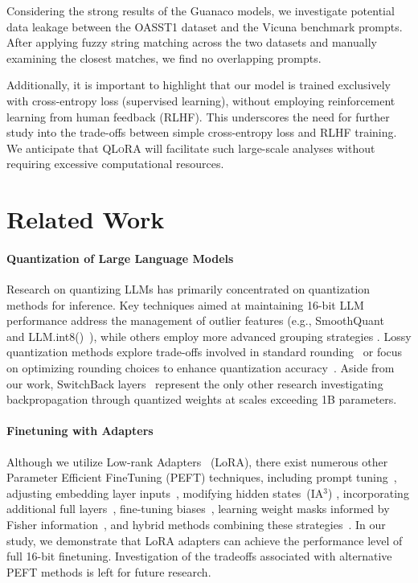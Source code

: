 Considering the strong results of the {Guanaco} models, we investigate potential data leakage between the OASST1 dataset and the Vicuna benchmark prompts. After applying fuzzy string matching across the two datasets and manually examining the closest matches, we find no overlapping prompts.

Additionally, it is important to highlight that our model is trained exclusively with cross-entropy loss (supervised learning), without employing reinforcement learning from human feedback (RLHF). This underscores the need for further study into the trade-offs between simple cross-entropy loss and RLHF training. We anticipate that \textsc{QLoRA} will facilitate such large-scale analyses without requiring excessive computational resources.

\section{Related Work}

\paragraph{Quantization of Large Language Models} Research on quantizing LLMs has primarily concentrated on quantization methods for inference. Key techniques aimed at maintaining 16-bit LLM performance address the management of outlier features (e.g., SmoothQuant~\citep{xiao2022smoothquant} and LLM.int8()~\citep{dettmers2022llm}), while others employ more advanced grouping strategies \citep{park2022nuqmm, yao2022zeroquant}. Lossy quantization methods explore trade-offs involved in standard rounding~\citep{dettmers2022case,zeng2022glm,pope2022efficiently} or focus on optimizing rounding choices to enhance quantization accuracy~\citep{frantar2022gptq}. Aside from our work, SwitchBack layers~\citep{wortsman2023stable} represent the only other research investigating backpropagation through quantized weights at scales exceeding 1B parameters.

\paragraph{Finetuning with Adapters} Although we utilize Low-rank Adapters~\citep{hu2021lora} (LoRA), there exist numerous other Parameter Efficient FineTuning (PEFT) techniques, including prompt tuning~\citep{qin2021learning,lester2021power,li2021prefix}, adjusting embedding layer inputs~\citep{an2022input}, modifying hidden states~(IA$^3$) \citep{liu2022few}, incorporating additional full layers~\citep{houlsby2019parameter}, fine-tuning biases~\citep{zaken2021bitfit}, learning weight masks informed by Fisher information~\citep{sung2021training}, and hybrid methods combining these strategies~\citep{henderson2021compacter}. In our study, we demonstrate that LoRA adapters can achieve the performance level of full 16-bit finetuning. Investigation of the tradeoffs associated with alternative PEFT methods is left for future research.

